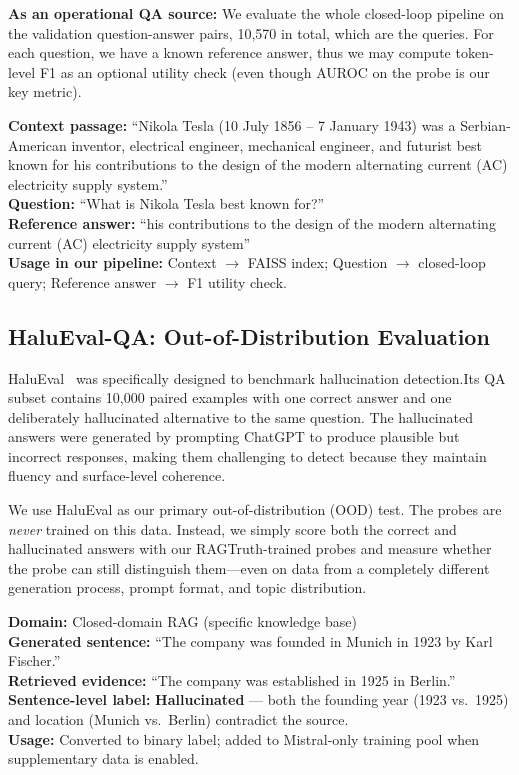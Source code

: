 \textbf{As an operational QA source:} We evaluate the whole closed-loop pipeline on the validation question-answer pairs, 10,570 in total, which are the queries. For each question, we have a known reference answer, thus we may compute token-level F1 as an optional utility check (even though AUROC on the probe is our key metric).

\begin{dataformatbox}
\small
\textbf{Context passage:} ``Nikola Tesla (10 July 1856 -- 7 January 1943) was a Serbian-American inventor, electrical engineer, mechanical engineer, and futurist best known for his contributions to the design of the modern alternating current (AC) electricity supply system.''\\[3pt]
\textbf{Question:} ``What is Nikola Tesla best known for?''\\[3pt]
\textbf{Reference answer:} ``his contributions to the design of the modern alternating current (AC) electricity supply system''\\[3pt]
\textbf{Usage in our pipeline:} Context $\to$ FAISS index; Question $\to$ closed-loop query; Reference answer $\to$ F1 utility check.
\end{dataformatbox}

\subsection{HaluEval-QA: Out-of-Distribution Evaluation}
\label{sec:halueval_dataset}

HaluEval~\cite{li2023halueval} was specifically designed to benchmark hallucination detection.Its QA subset contains 10,000 paired examples with one correct answer and one deliberately hallucinated alternative to the same question. The hallucinated answers were generated by prompting ChatGPT to produce plausible but incorrect responses, making them challenging to detect because they maintain fluency and surface-level coherence.

We use HaluEval as our primary out-of-distribution (OOD) test. The probes are \emph{never} trained on this data. Instead, we simply score both the correct and hallucinated answers with our RAGTruth-trained probes and measure whether the probe can still distinguish them—even on data from a completely different generation process, prompt format, and topic distribution.

\begin{dataformatbox}
\small
\textbf{Domain:} Closed-domain RAG (specific knowledge base)\\[3pt]
\textbf{Generated sentence:} ``The company was founded in Munich in 1923 by Karl Fischer.''\\[3pt]
\textbf{Retrieved evidence:} ``The company was established in 1925 in Berlin.''\\[3pt]
\textbf{Sentence-level label:} \textcolor{abstainred}{\textbf{Hallucinated}} --- both the founding year (1923 vs.\ 1925) and location (Munich vs.\ Berlin) contradict the source.\\[3pt]
\textbf{Usage:} Converted to binary label; added to Mistral-only training pool when supplementary data is enabled.
\end{dataformatbox}

